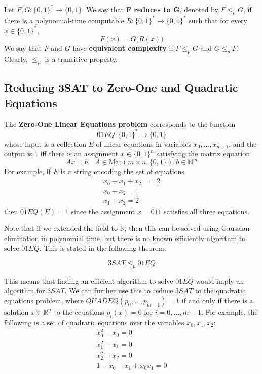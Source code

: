 \documentclass{article}
\begin{document}
  \begin{definition}
  Let $F, G: \{0,1\}^* \longrightarrow \{0,1\}$. We say that \textbf{F reduces to G}, denoted by $F \leq_p G$, if there is a polynomial-time computable $R: \{0,1\}^* \longrightarrow \{0,1\}^*$ such that for every $x \in \{0,1\}^*$, 
  \[F(x) = G \big(R(x)\big)\]
  We say that $F$ and $G$ have \textbf{equivalent complexity} if $F \leq_p G$ and $G \leq_p F$. Clearly, $\leq_p$ is a transitive property. 
  \end{definition}

  \subsection{Reducing 3SAT to Zero-One and Quadratic Equations}
  \begin{definition}
  The \textbf{Zero-One Linear Equations problem} corresponds to the function 
  \[01EQ: \{0,1\}^* \longrightarrow \{0,1\}\]
  whose input is a collection $E$ of linear equations in variables $x_0, ..., x_{n-1}$, and the output is $1$ iff there is an assignment $x \in \{0,1\}^n$ satisfying the matrix equation
  \[A x = b, \;\; A \in \text{Mat}(m \times n, \{0,1\}), b \in \mathbb{N}^m\]
  For example, if $E$ is a string encoding the set of equations
  \begin{align*}
      x_0 + x_1 + x_2 & = 2 \\
      x_0 + x_2 = 1 \\
      x_1 + x_2 = 2
  \end{align*}
  then $01EQ(E) = 1$ since the assignment $x = 011$ satisfies all three equations.  
  \end{definition}

  Note that if we extended the field to $\mathbb{R}$, then this can be solved using Gaussian elimination in polynomial time, but there is no known efficiently algorithm to solve $01EQ$. This is stated in the following theorem. 

  \begin{theorem}
  \[3SAT \leq_p 01EQ\]
  \end{theorem}

  This means that finding an efficient algorithm to solve $01EQ$ would imply an algorithm for $3SAT$. We can further use this to reduce $3SAT$ to the quadratic equations problem, where $QUADEQ(p_0, ..., p_{m-1}) = 1$ if and only if there is a solution $x \in \mathbb{R}^n$ to the equations $p_i (x) = 0$ for $i = 0, ..., m-1$. For example, the following is a set of quadratic equations over the variables $x_0, x_1, x_2$: 
  \begin{align*}
      x_0^2 - x_0 = 0 \\
      x_1^2 - x_1 = 0 \\
      x_2^2 - x_2 = 0 \\
      1 - x_0 - x_1 + x_0 x_1 = 0
  \end{align*}
\end{document}
